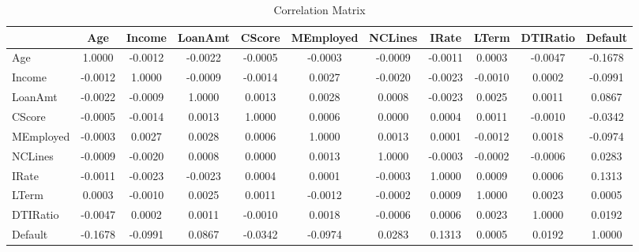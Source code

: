 \documentclass[12pt]{article}
\begin{document}
\begin{table}[htbp]
    \centering
    \caption{Correlation Matrix}
    \small
    \begin{adjustbox}{width=\textwidth}
    \begin{tabular}{l*{10}{@{\extracolsep{4pt}}c}}
        \toprule
        & Age & Income & LoanAmt & CScore & MEmployed & NCLines & IRate & LTerm & DTIRatio & Default \\
        \midrule
        Age & 1.0000 & -0.0012 & -0.0022 & -0.0005 & -0.0003 & -0.0009 & -0.0011 & 0.0003 & -0.0047 & -0.1678 \\
        Income & -0.0012 & 1.0000 & -0.0009 & -0.0014 & 0.0027 & -0.0020 & -0.0023 & -0.0010 & 0.0002 & -0.0991 \\
        LoanAmt & -0.0022 & -0.0009 & 1.0000 & 0.0013 & 0.0028 & 0.0008 & -0.0023 & 0.0025 & 0.0011 & 0.0867 \\
        CScore & -0.0005 & -0.0014 & 0.0013 & 1.0000 & 0.0006 & 0.0000 & 0.0004 & 0.0011 & -0.0010 & -0.0342 \\
        MEmployed & -0.0003 & 0.0027 & 0.0028 & 0.0006 & 1.0000 & 0.0013 & 0.0001 & -0.0012 & 0.0018 & -0.0974 \\
        NCLines & -0.0009 & -0.0020 & 0.0008 & 0.0000 & 0.0013 & 1.0000 & -0.0003 & -0.0002 & -0.0006 & 0.0283 \\
        IRate & -0.0011 & -0.0023 & -0.0023 & 0.0004 & 0.0001 & -0.0003 & 1.0000 & 0.0009 & 0.0006 & 0.1313 \\
        LTerm & 0.0003 & -0.0010 & 0.0025 & 0.0011 & -0.0012 & -0.0002 & 0.0009 & 1.0000 & 0.0023 & 0.0005 \\
        DTIRatio & -0.0047 & 0.0002 & 0.0011 & -0.0010 & 0.0018 & -0.0006 & 0.0006 & 0.0023 & 1.0000 & 0.0192 \\
        Default & -0.1678 & -0.0991 & 0.0867 & -0.0342 & -0.0974 & 0.0283 & 0.1313 & 0.0005 & 0.0192 & 1.0000 \\
        \bottomrule
    \end{tabular}
    \end{adjustbox}
    \label{table:correlationMatrix}
\end{table}
\end{document}
